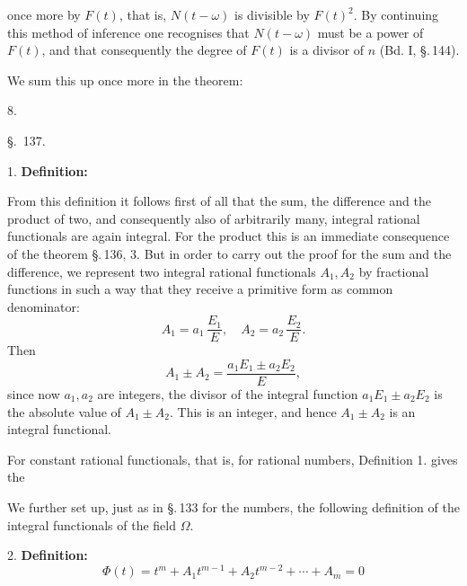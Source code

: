 once more by $F(t)$, that is, $N(t-\omega)$ is divisible by $F(t)^2$. By continuing this method of inference one recognises that $N(t-\omega)$ must be a power of $F(t)$, and that consequently the degree of $F(t)$ is a divisor of $n$ (Bd. I, \S.\,144).

We sum this up once more in the theorem:

8. 

\begin{center}
\S.\ 137.

\end{center}

1. \textbf{Definition:} 

From this definition it follows first of all that the sum, the difference and the product of two, and consequently also of arbitrarily many, integral rational functionals are again integral. For the product this is an immediate consequence of the theorem \S.\,136, 3. But in order to carry out the proof for the sum and the difference, we represent two integral rational functionals $A_1, A_2$ by fractional functions in such a way that they receive a primitive form as common denominator:
\[
A_1 = a_1\,\frac{E_1}{E}, \quad A_2 = a_2\,\frac{E_2}{E}.
\]
Then
\[
A_1 \pm A_2 = \frac{a_1 E_1 \pm a_2 E_2}{E},
\]
since now $a_1, a_2$ are integers, the divisor of the integral function $a_1 E_1 \pm a_2 E_2$ is the absolute value of $A_1 \pm A_2$. This is an integer, and hence $A_1 \pm A_2$ is an integral functional.

For constant rational functionals, that is, for rational numbers, Definition 1. gives the 

We further set up, just as in \S.\,133 for the numbers, the following definition of the integral functionals of the field $\Omega$.

2. \textbf{Definition:} 
\[
\Phi(t) = t^m + A_1 t^{m-1} + A_2 t^{m-2} + \cdots + A_m = 0
\]
